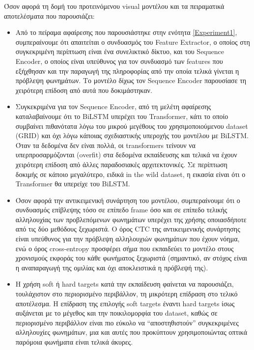 Όσον αφορά τη δομή του προτεινόμενου visual μοντέλου και τα πειραματικά αποτελέσματα που παρουσιάζει:

\begin{itemize}
\item Από το πείραμα αφαίρεσης που παρουσιάστηκε στην ενότητα \ref{Experiment1}, συμπεραίνουμε ότι απαιτείται ο συνδυασμός του Feature Extractor, ο οποίος στη συγκεκριμένη περίπτωση είναι ένα συνελικτικό δίκτυο, και του Sequence Encoder, ο οποίος είναι υπεύθυνος για τον συνδυασμό των features που εξήχθησαν και την παραγωγή της πληροφορίας από την οποία τελικά γίνεται η πρόβλεψη φωνημάτων. Το μοντέλο δίχως τον Sequence Encoder παρουσίασε τη χειρότερη επίδοση από αυτά που δοκιμάστηκαν.

\item Συγκεκριμένα για τον Sequence Encoder, από τη μελέτη αφαίρεσης καταλαβαίνουμε ότι το BiLSTM υπερέχει του Transformer, κάτι το οποίο συμβαίνει πιθανότατα λόγω του μικρού μεγέθους του χρησιμοποιούμενου dataset (GRID) και όχι λόγω κάποιας σχεδιαστικής υπεροχής του μοντέλου με BiLSTM. Όταν τα δεδομένα δεν είναι πολλά, οι transformers τείνουν να υπερπροσαρμόζονται (overfit) στα δεδομένα εκπαίδευσης και τελικά να έχουν χειρότερη επίδοση από άλλες παραδοσιακές αρχιτεκτονικές. Σε περίπτωση δοκιμής σε κάποιο μεγαλύτερο, ειδικά in the wild dataset, η εικασία είναι ότι ο Transformer θα υπερείχε του BiLSTM.

\item Όσον αφορά την αντικειμενική συνάρτηση του μοντέλου, συμπεραίνουμε ότι ο συνδυασμός επίβλεψης τόσο σε επίπεδο frame όσο και σε επίπεδο τελικής αλληλουχίας των προβλεπόμενων φωνημάτων υπερέχει της χρήσης οποιασδήποτε από τις δύο μεθόδους ξεχωριστά. Ο όρος CTC της αντικειμενικής συνάρτησης είναι υπεύθυνος για την πρόβλεψη αλληλουχιών φωνημάτων που έχουν νόημα, ενώ ο όρος cross-entropy προσφέρει σήμα που εκπαιδεύει το μοντέλο στους χρονισμούς εκφοράς του κάθε φωνήματος ξεχωριστά (σημαντικό, αν στόχος είναι η αναπαραγωγή της ομιλίας και όχι αποκλειστικά η πρόβλεψή της).

\item Η χρήση soft ή hard targets κατά την εκπαίδευση φαίνεται να παρουσιάζει, τουλάχιστον στο περιορισμένο περιβάλλον, τη μικρότερη επίδραση στο τελικό αποτέλεσμα. Η επίδραση της επιλογής soft targets έναντι hard targets ίσως αυξάνεται με το μέγεθος και την ποικιλομορφία του dataset, καθώς σε περιορισμένο περιβάλλον είναι πιο εύκολο να ``αποστηθιστούν'' συγκεκριμένες αλληλουχίες φωνημάτων, μια και αυτές που προκύπτουν χρησιμοποιώντας οπτικά παρόμοια φωνήματα είναι τελικά άκυρες.


\end{itemize}

